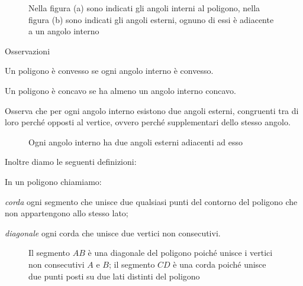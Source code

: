 \begin{inaccessibleblock}
 \begin{figure}[htb]
\centering
\caption{Nella figura (a) sono indicati gli angoli interni al 
poligono, nella figura (b) sono indicati gli angoli esterni, ognuno 
di essi è adiacente a un angolo interno}
\end{figure}
\end{inaccessibleblock}

Osservazioni
\begin{itemize*}
\item Un poligono è convesso se ogni angolo interno è convesso.
\item Un poligono è concavo se ha almeno un angolo interno concavo.
\end{itemize*}

Osserva che per ogni angolo interno esistono due angoli esterni, 
congruenti tra di loro perché opposti al vertice, ovvero perché 
supplementari dello stesso angolo.


\begin{inaccessibleblock}
 \begin{figure}[htb]
\centering
\caption{Ogni angolo interno ha due angoli esterni adiacenti ad esso}
\end{figure}
\end{inaccessibleblock}

Inoltre diamo le seguenti definizioni:
\begin{definizione}
In un poligono chiamiamo:
\begin{itemize*}
\item \emph{corda} ogni segmento che unisce due qualsiasi punti del 
contorno del poligono che non appartengono allo stesso lato;
\item \emph{diagonale} ogni corda che unisce due vertici non 
consecutivi.
\end{itemize*}
\end{definizione}


\begin{inaccessibleblock}
 \begin{figure}[htb]
\centering
\caption{Il segmento $AB$ è una diagonale del poligono poiché unisce 
i vertici non consecutivi $A$ e $B$; il segmento $CD$ è una corda 
poiché unisce due punti posti su due lati distinti del poligono}
\end{figure}
\end{inaccessibleblock}

